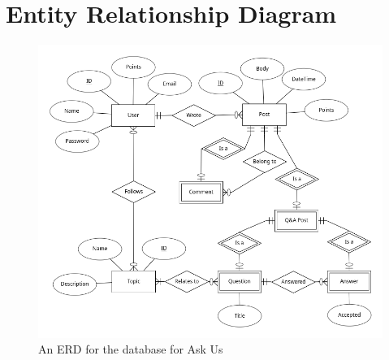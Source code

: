 \section{Entity Relationship Diagram}

\begin{figure}[htb]
	\centering
	\includegraphics[width=\linewidth]{../ERD/erd.png}
	\caption{An ERD for the database for Ask Us}
	\label{erd}
\end{figure}